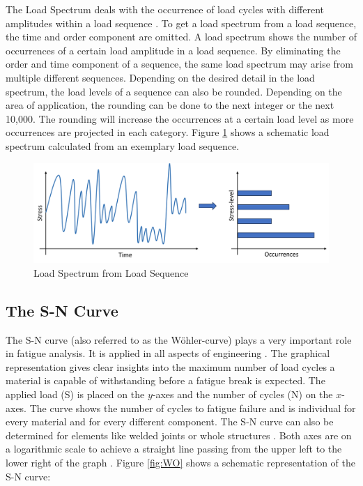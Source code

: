 The Load Spectrum deals with the occurrence of load cycles with different amplitudes within a load sequence \cite{Facchinetti}. To get a load spectrum from a load sequence, the time and order component are omitted. A load spectrum shows the number of occurrences of a certain load amplitude in a load sequence.
By eliminating the order and time component of a sequence, the same load spectrum may arise from multiple different sequences. Depending on the desired detail in the load spectrum, the load levels of a sequence can also be rounded. Depending on the area of application, the rounding can be done to the next integer or the next 10,000.
\newpage
The rounding will increase the occurrences at a certain load level as more occurrences are projected in each category. 
Figure \ref{fig:LS} shows a schematic load spectrum calculated from an exemplary load sequence.


\begin{figure}[H]
	\centering
	\includegraphics[width=1\linewidth]{IMGs/Spectrum.png}
	\caption{Load Spectrum from Load Sequence}
	\label{fig:LS}
\end{figure}

\subsection{The S-N Curve}\label{sn}
The S-N curve (also referred to as the Wöhler-curve) plays a very important role in fatigue analysis. It is applied in all aspects of engineering \cite{Burhan,Pungo}. 
The graphical representation gives clear insights into the maximum number of load cycles a material is capable of withstanding before a fatigue break is expected.
The applied load (S) is placed on the \(y\)-axes and the number of cycles (N) on the \(x\)-axes. The curve shows the number of cycles to fatigue failure and is individual for every material and for every different component.
The S-N curve can also be determined for elements like welded joints or whole structures \cite{Baptista, Dong}.
Both axes are on a logarithmic scale to achieve a straight line passing from the upper left to the lower right of the graph \cite{Little}. Figure \ref{fig:WO} shows a schematic representation of the S-N curve: 

